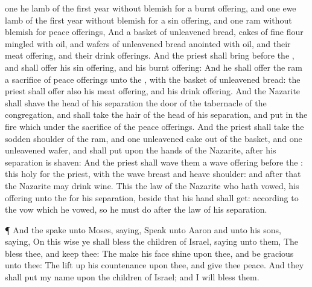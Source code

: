 {one he
lamb of the
first
year without
blemish for a burnt
offering, and
one ewe
lamb of the
first
year without
blemish for a sin
offering, and
one
ram without
blemish for peace
offerings,
And a
basket of unleavened
bread,
cakes of fine
flour
mingled with
oil, and
wafers of unleavened
bread
anointed with
oil, and their meat
offering, and their drink
offerings.
And the
priest shall
bring
{}
before the
{}, and shall
offer his sin
offering, and his burnt
offering:
And he shall
offer the
ram
{} a
sacrifice of peace
offerings unto the
{}, with the
basket of unleavened
bread: the
priest shall
offer also his meat
offering, and his drink
offering.
And the
Nazarite shall
shave the
head of his
separation
{} the
door of the
tabernacle of the
congregation, and shall
take the
hair of the
head of his
separation, and
put
{} in the
fire which
{} under the
sacrifice of the peace
offerings.
And the
priest shall
take the
sodden
shoulder of the
ram, and
one
unleavened
cake out of the
basket, and
one
unleavened
wafer, and shall
put
{} upon the
hands of the
Nazarite,
after
{} his
separation is
shaven:
And the
priest shall
wave them
{} a wave
offering
before the
{}: this
{}
holy for the
priest, with the
wave
breast and
heave
shoulder: and
after that the
Nazarite may
drink
wine.
This
{} the
law of the
Nazarite who hath
vowed,
{} his
offering unto the
{} for his
separation, beside
{} that his
hand shall
get:
according to the
vow which he
vowed, so he must
do after the
law of his
separation.
\par }{\PP {}¶ And the
{}
spake unto
Moses,
saying,
Speak unto
Aaron and unto his
sons,
saying, On this
wise ye shall
bless the
children of
Israel,
saying unto them,
The
{}
bless thee, and
keep thee:
The
{} make his
face
shine upon thee, and be
gracious unto thee:
The
{} lift
up his
countenance upon thee, and
give thee
peace.
And they shall
put my
name upon the
children of
Israel; and I will
bless them.

}
